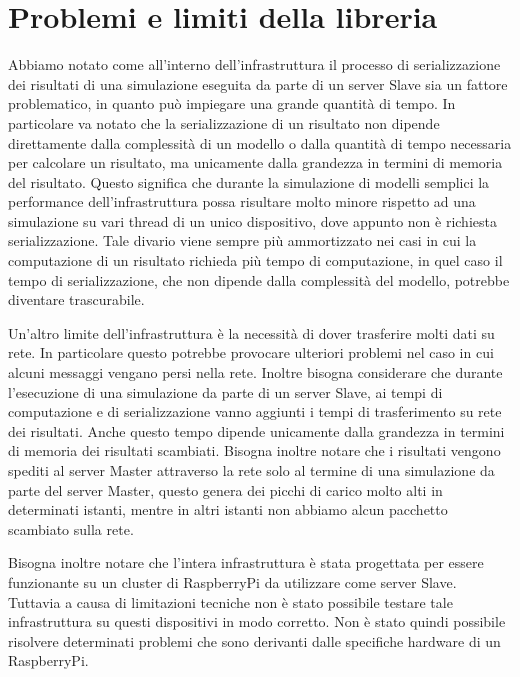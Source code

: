 \section{Problemi e limiti della libreria}

Abbiamo notato come all'interno dell'infrastruttura il processo di serializzazione dei risultati di una simulazione eseguita da parte di un server Slave sia un fattore problematico, in quanto può impiegare una grande quantità di tempo. In particolare va notato che la serializzazione di un risultato non dipende direttamente dalla complessità di un modello o dalla quantità di tempo necessaria per calcolare un risultato, ma unicamente dalla grandezza in termini di memoria del risultato. Questo significa che durante la simulazione di modelli semplici la performance dell'infrastruttura possa risultare molto minore rispetto ad una simulazione su vari thread di un unico dispositivo, dove appunto non è richiesta serializzazione. Tale divario viene sempre più ammortizzato nei casi in cui la computazione di un risultato richieda più tempo di computazione, in quel caso il tempo di serializzazione, che non dipende dalla complessità del modello, potrebbe diventare trascurabile.

Un'altro limite dell'infrastruttura è la necessità di dover trasferire molti dati su rete. In particolare questo potrebbe provocare ulteriori problemi nel caso in cui alcuni messaggi vengano persi nella rete. Inoltre bisogna considerare che durante l'esecuzione di una simulazione da parte di un server Slave, ai tempi di computazione e di serializzazione vanno aggiunti i tempi di trasferimento su rete dei risultati. Anche questo tempo dipende unicamente dalla grandezza in termini di memoria dei risultati scambiati. Bisogna inoltre notare che i risultati vengono spediti al server Master attraverso la rete solo al termine di una simulazione da parte del server Master, questo genera dei picchi di carico molto alti in determinati istanti, mentre in altri istanti non abbiamo alcun pacchetto scambiato sulla rete.

Bisogna inoltre notare che l'intera infrastruttura è stata progettata per essere funzionante su un cluster di RaspberryPi da utilizzare come server Slave. Tuttavia a causa di limitazioni tecniche non è stato possibile testare tale infrastruttura su questi dispositivi in modo corretto. Non è stato quindi possibile risolvere determinati problemi che sono derivanti dalle specifiche hardware di un RaspberryPi.